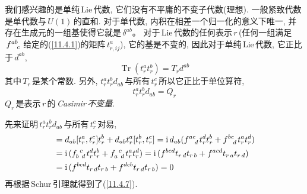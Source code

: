 我们感兴趣的是单纯\,Lie\,代数, 它们没有不平庸的不变子代数(理想). 一般紧致代数是单代数与$\,U(1)\,$的直和. 对于单代数, 内积在相差一个归一化的意义下唯一, 并存在生成元的一组基使得它就是$\,\delta^{ab}$。 对于\,Lie\,代数的任何表示$\,r\,$(任何一组满足$\,f\indices{^a^b_c}\,$给定的(\ref{11.4.1})的矩阵$\,t^{a}_{r,ij}$), 它的基是不变的, 因此对于单纯\,Lie\,代数, 它正比于$\,d^{ab}$,
\begin{equation}
    \operatorname{Tr}(t_{r}^{a}t_{r}^{b}) = T_{r}d^{ab} \label{11.4.6}
\end{equation}
其中$\,T_{r}\,$是某个常数. 另外, $t_{r}^{a}t_{r}^{b}d_{ab}\,$与所有$\,t_{r}^{c}\,$所以它正比于单位算符,
\begin{equation}
    t_{r}^{a}t_{r}^{b}d_{ab} = Q_{r}  \label{11.4.7}
\end{equation}
$Q_{r}$\,是表示$\,r\,$的\,\emph{Casimir}\,{\emph{不变量}}.
\begin{tcolorbox}
先来证明$\,t_{r}^{a}t_{r}^{b}d_{ab}\,$与所有$\,t_{r}^{c}\,$对易, 
\begin{align*}
    [d_{ab}t_{r}^{a}t_{r}^{b},t_{r}^{c}] &= d_{ab}[t_{r}^{a},t_{r}^{c}]t_{r}^{b} 
    + d_{ab}t_{r}^{a}[t_{r}^{b},t_{r}^{c}] 
    =\mi \, d_{ab} (f\indices{^a^c_d}t_{r}^{d}t_{r}^{b}+ f\indices{^b^c_d}t_{r}^{a}t_{r}^{d}) \\
    &=\mi \, (f\indices{_b^c_d}t_{r}^{d}t_{r}^{b}+ f\indices{_a^c_d}t_{r}^{a}t_{r}^{d}) 
    =\mi \, (f\indices{^b^c^d}t_{r\,d}t_{r\,b}+ f\indices{^a^c^d}t_{r\,a}t_{r\,d}) \\
     &=\mi \, (f\indices{^b^c^d}t_{r\,d}t_{r\,b}+ f\indices{^d^c^b}t_{r\,d}t_{r\,b}) =0
\end{align*}
再根据\,Schur\,引理就得到了(\ref{11.4.7}).
\end{tcolorbox}

